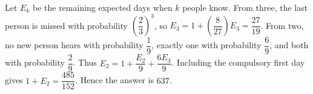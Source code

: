 Let $E_k$ be the remaining expected days when $k$ people know. From three, the last person is missed with probability $(\dfrac{2}{3})^3$, so $E_3=1+(\dfrac{8}{27})E_3=\dfrac{27}{19}$. From two, no new person hears with probability $\dfrac{1}{9}$, exactly one with probability $\dfrac{6}{9}$, and both with probability $\dfrac{2}{9}$. Thus $E_2=1+\dfrac{E_2}{9}+\dfrac{6E_3}{9}$. Including the compulsory first day gives $1+E_2=\dfrac{485}{152}$. Hence the answer is $\boxed{637}$.
